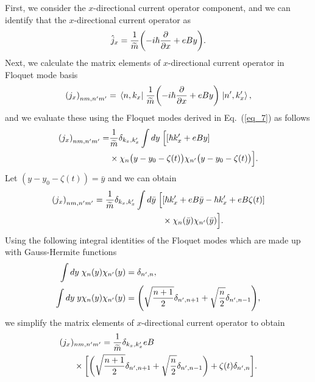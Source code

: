 First, we consider the $x$-directional current operator component, and we can identify that the $x$-directional current operator as
\begin{equation} \label{eq_d4}
  \hat{j}_x = \frac{1}{\widetilde{m}} \qty(-i\hbar\pdv{x} + eBy).
\end{equation}
Next, we calculate the matrix elements of $x$-directional current operator in Floquet mode basis
\begin{equation} \label{eq_d5}
  \qty({j}_x)_{nm,n'm'} =
  \mel{n,k_x}{\;\frac{1}{\widetilde{m}} \qty(-i\hbar\pdv{x} + eBy)\;}{n',k'_x},
\end{equation}
and we evaluate these using the Floquet modes derived in Eq.~(\ref{eq_7}) as follows
\begin{equation} \label{eq_d6}
  \begin{aligned}
    \qty({j}_x)_{nm,n'm'} = &
    \frac{1}{{\widetilde{m}}}
    \delta_{k_x,k'_x}
    \int dy \;
    \Big[
    \qty[\hbar k'_x + eBy] \\
    & \times
     \chi_{n}\big(y - y_0 - \zeta(t)\big)
    \chi_{n'}\big(y - y_0 - \zeta(t)\big)
    \Big].
  \end{aligned}
\end{equation}
Let $(y - y_0 - \zeta(t)) = \bar{y}$ and we can obtain
\begin{equation} \label{eq_d7}
  \begin{aligned}
    \qty({j}_x)_{nm,n'm'} =
    \frac{1}{{\widetilde{m}}}
    \delta_{k_x,k'_x}
    \int d\bar{y} \;
    \Big[ &
    \qty[\hbar k'_x + eB\bar{y} -\hbar k'_x + eB\zeta(t)] \\
    & \times
    \chi_{n}(\bar{y})
    \chi_{n'}(\bar{y})
    \Big].
  \end{aligned}
\end{equation}
Using the following integral identities of the Floquet modes which are made up with Gauss-Hermite functions \cite{vedenyapin11,szego59}
\begin{subequations} \label{eq_d8}
  \begin{align}
    \int d{y} \;
    \chi_{n}({y})
    \chi_{n'}({y}) &=
    \delta_{n',n}, \\
    \int dy \;
    y
    \chi_{n}({y})
    \chi_{n'}({y}) &=
    \qty(\sqrt{\frac{n+1}{2}} \delta_{n',n+1} + \sqrt{\frac{n}{2}}
    \delta_{n',n-1}),
  \end{align}
\end{subequations}
we simplify the matrix elements of $x$-directional current operator to obtain
\begin{equation} \label{eq_d9}
  \begin{aligned}
    \qty({j}_x)&_{nm,n'm'} =
    \frac{1}{{\widetilde{m}}}
    \delta_{k_x,k'_x}
    eB\\
    & \times
    \bigg[
    \bigg(\sqrt{\frac{n+1}{2}} \delta_{n',n+1} + \sqrt{\frac{n}{2}}
    \delta_{n',n-1}\bigg)
    + \zeta(t) \delta_{n',n}
    \bigg].
  \end{aligned}
\end{equation}
